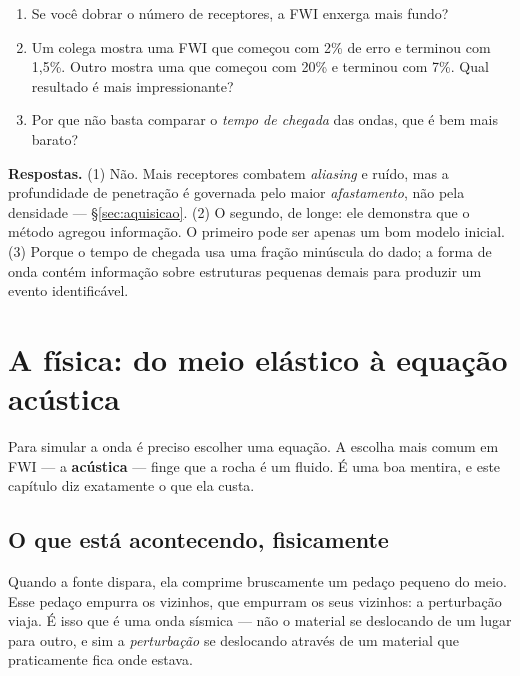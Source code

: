 \documentclass[11pt,a4paper,oneside]{report}
\begin{document}
\begin{exercicio}
\begin{enumerate}[leftmargin=*, itemsep=2pt]
\item Se voc\^e dobrar o n\'umero de receptores, a FWI enxerga mais fundo?
\item Um colega mostra uma FWI que come\c{c}ou com 2\% de erro e terminou com
1{,}5\%. Outro mostra uma que come\c{c}ou com 20\% e terminou com 7\%. Qual
resultado \'e mais impressionante?
\item Por que n\~ao basta comparar o \emph{tempo de chegada} das ondas, que
\'e bem mais barato?
\end{enumerate}
\textbf{Respostas.} (1) N\~ao. Mais receptores combatem \emph{aliasing} e
ru\'ido, mas a profundidade de penetra\c{c}\~ao \'e governada pelo maior
\emph{afastamento}, n\~ao pela densidade --- §\ref{sec:aquisicao}. (2) O
segundo, de longe: ele demonstra que o m\'etodo agregou informa\c{c}\~ao. O
primeiro pode ser apenas um bom modelo inicial. (3) Porque o tempo de chegada
usa uma fra\c{c}\~ao min\'uscula do dado; a forma de onda cont\'em
informa\c{c}\~ao sobre estruturas pequenas demais para produzir um evento
identific\'avel.
\end{exercicio}

\chapter{A f\'isica: do meio el\'astico \`a equa\c{c}\~ao ac\'ustica}
\label{cap:fisica}

\begin{ideia}
Para simular a onda \'e preciso escolher uma equa\c{c}\~ao. A escolha mais
comum em FWI --- a \textbf{ac\'ustica} --- finge que a rocha \'e um fluido.
\'E uma boa mentira, e este cap\'itulo diz exatamente o que ela custa.
\end{ideia}

\section{O que est\'a acontecendo, fisicamente}

Quando a fonte dispara, ela comprime bruscamente um peda\c{c}o pequeno do
meio. Esse peda\c{c}o empurra os vizinhos, que empurram os seus vizinhos: a
perturba\c{c}\~ao viaja. \'E isso que \'e uma onda s\'ismica --- n\~ao o
material se deslocando de um lugar para outro, e sim a \emph{perturba\c{c}\~ao}
se deslocando atrav\'es de um material que praticamente fica onde estava.
\end{document}
